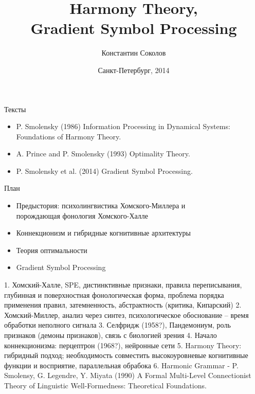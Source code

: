 \documentclass{beamer}
\begin{document}
\title{\Large{Harmony Theory, \\Gradient Symbol Processing}}
\author{Константин Соколов}
\date{Санкт-Петербург, 2014} 
\begin{frame}
    \thispagestyle{empty}
    \titlepage
\end{frame}

\begin{frame}{Тексты}
\setcounter{framenumber}{1}
\begin{itemize}
	\item P. Smolensky (1986) Information Processing in Dynamical Systems: Foundations of Harmony Theory.
    \medskip
    \item A. Prince and P. Smolensky (1993) Optimality Theory.
    \item P. Smolensky et al. (2014) Gradient Symbol Processing.
\end{itemize}
\end{frame}

\begin{frame}{План}
    \begin{itemize}
        \item Предыстория: психолингвистика Хомского-Миллера и \\порождающая фонология Хомского-Халле
        \medskip
        \item Коннекционизм и гибридные когнитивные архитектуры
        \medskip
        \item Теория оптимальности
        \medskip
        \item Gradient Symbol Processing
    \end{itemize}
\end{frame}

1. Хомский-Халле, SPE, дистинктивные признаки, правила переписывания, глубинная и поверхностная фонологическая форма, проблема порядка применения правил, затемненность, абстрактность (критика, Кипарский)
2. Хомский-Миллер, анализ через синтез, психологическое обоснование -- время обработки неполного сигнала
3. Селфридж (1958?), Пандемониум, роль признаков (демоны признаков), связь с биологией зрения
4. Начало коннекционизма: перцептрон (1968?), нейронные сети
5. Harmony Theory: гибридный подход; необходимость совместить высокоуровневые когнитивные функции и восприятие, параллельная обрабока
6. Harmonic Grammar - P. Smolensy, G. Legendre, Y. Miyata (1990)  A Formal Multi-Level Connectionist Theory of Linguistic Well-Formedness: Theoretical Foundations.
\end{document}
